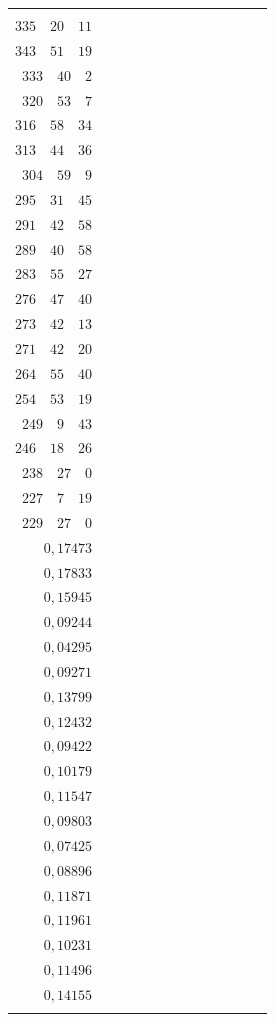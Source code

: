 \begin{landscape}
\begin{center}
\begin{tabular}{r|r|r|r|r|r|r|r|r|r|r|r|r}
{\(311\quad 32\quad 53\) \\
\(335\quad 20\quad 11\) \\[3pt]
\(343\quad 51\quad 19\) \\
\(333\quad 40\quad 2\) \\
\(320\quad 53\quad 7\) \\
\(316\quad 58\quad 34\) \\[3pt]
\(313\quad 44\quad 36\) \\
\(304\quad 59\quad 9\) \\
\(295\quad 31\quad 45\) \\
\(291\quad 42\quad 58\) \\[3pt]
\(289\quad 40\quad 58\) \\
\(283\quad 55\quad 27\) \\
\(276\quad 47\quad 40\) \\
\(273\quad 42\quad 13\) \\[3pt]
\(271\quad 42\quad 20\) \\
\(264\quad 55\quad 40\) \\
\(254\quad 53\quad 19\) \\
\(249\quad 9\quad 43\) \\[3pt]
\(246\quad 18\quad 26\) \\
\(238\quad 27\quad 0\) \\
\(227\quad 7\quad 19\) \\
\(229\quad 27\quad 0\)
}
&
\GaussVIIcolumn{
\(0{,}17026\) \\
\(0{,}17473\) \\
\(0{,}17833\) \\
\(0{,}15945\) \\[3pt]
\(0{,}09244\) \\
\(0{,}04295\) \\
\(0{,}09271\) \\
\(0{,}13799\) \\[3pt]
\(0{,}12432\) \\
\(0{,}09422\) \\
\(0{,}10179\) \\
\(0{,}11547\) \\[3pt]
\(0{,}09803\) \\
\(0{,}07425\) \\
\(0{,}08896\) \\
\(0{,}11871\) \\[3pt]
\(0{,}11961\) \\
\(0{,}10231\) \\
\(0{,}11496\) \\
\(0{,}14155\) \\[3pt]
}
\end{tabular}
\end{center}
\end{landscape}
